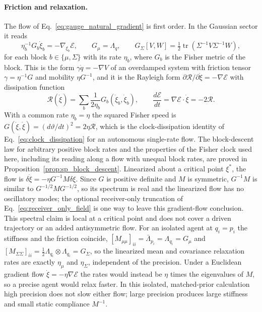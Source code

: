 \paragraph{Friction and relaxation.} The flow of Eq.~\eqref{eq:gauge_natural_gradient} is first order. In the Gaussian sector it reads
\begin{equation}
\eta_b^{-1}G_b\dot{\xi}_b = -\nabla_{\xi_b}\mathcal{E},
\qquad
G_\mu = \Lambda_q,
\qquad
G_\Sigma[V, W] = \tfrac12\operatorname{tr}(\Sigma^{-1}V\Sigma^{-1}W),
\label{eq:friction_form}
\end{equation}
for each block $b \in \{\mu, \Sigma\}$ with its rate $\eta_b$, where $G_b$ is the Fisher metric of the block. This is the form $\gamma\dot{q} = -\nabla V$ of an overdamped system with friction tensor $\gamma = \eta^{-1}G$ and mobility $\eta G^{-1}$, and it is the Rayleigh form $\partial\mathcal{R}/\partial\dot{\xi} = -\nabla\mathcal{E}$ with dissipation function
\begin{equation}
\mathcal{R}(\dot{\xi}) = \sum_b \frac{1}{2\eta_b}G_b(\dot{\xi}_b, \dot{\xi}_b),
\qquad
\frac{d\mathcal{E}}{dt} = \nabla\mathcal{E}\cdot\dot{\xi} = -2\mathcal{R}.
\label{eq:rayleigh_dissipation}
\end{equation}
With a common rate $\eta_b = \eta$ the squared Fisher speed is $G(\dot{\xi}, \dot{\xi}) = (d\vartheta/dt)^2 = 2\eta\mathcal{R}$, which is the clock-dissipation identity of Eq.~\eqref{eq:clock_dissipation} for an autonomous single-rate flow. The block-descent law for arbitrary positive block rates and the properties of the Fisher clock used here, including its reading along a flow with unequal block rates, are proved in Proposition~\ref{prop:sp_block_descent}. Linearized about a critical point $\xi^*$, the flow is $\delta\dot{\xi} = -\eta G^{-1}M\delta\xi$. Since $G$ is positive definite and $M$ is symmetric, $G^{-1}M$ is similar to $G^{-1/2}MG^{-1/2}$, so its spectrum is real and the linearized flow has no oscillatory modes; the optional receiver-only truncation of Eq.~\eqref{eq:receiver_only_field} is one way to leave this gradient-flow conclusion. This spectral claim is local at a critical point and does not cover a driven trajectory or an added antisymmetric flow. For an isolated agent at $q_i = p_i$ the stiffness and the friction coincide, $[M_{\mu\mu}]_{ii} = \bar{\Lambda}_{p_i} = \Lambda_{q_i} = G_\mu$ and $[M_{\Sigma\Sigma}]_{ii} = \tfrac12\Lambda_{q_i}\otimes\Lambda_{q_i} = G_\Sigma$, so the linearized mean and covariance relaxation rates are exactly $\eta_\mu$ and $\eta_\Sigma$, independent of the precision. Under a Euclidean gradient flow $\dot{\xi} = -\eta\nabla\mathcal{E}$ the rates would instead be $\eta$ times the eigenvalues of $M$, so a precise agent would relax faster. In this isolated, matched-prior calculation high precision does not slow either flow; large precision produces large stiffness and small static compliance $M^{-1}$.

